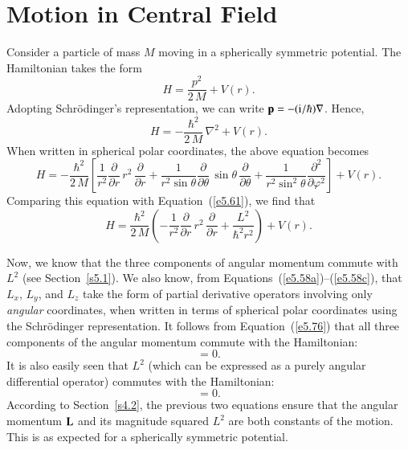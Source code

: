 \section{Motion in  Central Field}\label{s5.5}
Consider a particle of mass $M$ moving in a spherically symmetric potential.
The Hamiltonian takes the form
\begin{equation}
H = \frac{{p}^2}{2\,M} + V(r).
\end{equation}
Adopting Schr\"{o}dinger's representation, we can write ${\bf p} = -({\rm i}/\hbar)
\nabla$. Hence,
\begin{equation}
H = -\frac{\hbar^2}{2\,M}\, \nabla^2 + V(r).
\end{equation}
When written in spherical polar coordinates, the above equation becomes
\begin{equation}
H= -\frac{\hbar^2}{2\,M}\left[ \frac{1}{r^2}\frac{\partial}{\partial r}\,
r^2\,\frac{\partial}{\partial r}  + \frac{1}{r^2\sin\theta}
\frac{\partial}{\partial \theta} \,
\sin\theta \,\frac{\partial}{\partial\theta} 
+ \frac{1}{r^2\sin^2\theta} \frac{\partial^2}{\partial\varphi^2}\right]
+ V(r).
\end{equation}
Comparing this equation with Equation~(\ref{e5.61}), we find that
\begin{equation}\label{e5.76}
H= \frac{\hbar^2}{2\,M}\left(- \frac{1}{r^2}\frac{\partial}{\partial r}
\,r^2\,\frac{\partial}{\partial r} + \frac{L^2}{\hbar^2 r^2}\right) +
V(r).
\end{equation}

Now, we know that the three components of angular momentum commute with $L^2$ (see Section~\ref{s5.1}). We also know, from Equations~(\ref{e5.58a})--(\ref{e5.58c}), that $L_x$, $L_y$, and $L_z$ take the
form of partial derivative operators involving only {\em angular}\/ coordinates, 
when written in terms of spherical polar coordinates using the  Schr\"{o}dinger  representation. It follows from Equation~(\ref{e5.76}) that all three components of the angular
momentum commute with the Hamiltonian:
\begin{equation}
[{\bf L}, H] = 0.
\end{equation}
It is also easily seen that $L^2$ (which can be expressed as a purely angular differential operator) commutes with the Hamiltonian:
\begin{equation}
[L^2, H] = 0.
\end{equation}
According to Section~\ref{s4.2},  the previous two equations
ensure that the angular momentum ${\bf L}$ and its magnitude squared $L^2$
are both constants of the motion. This is as expected for a spherically
symmetric potential. 

